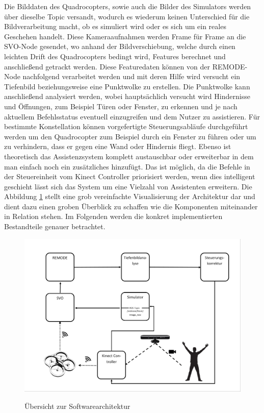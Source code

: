 Die Bilddaten des Quadrocopters, sowie auch die Bilder des Simulators werden über dieselbe Topic versandt, wodurch es wiederum keinen Unterschied für die Bildverarbeitung macht, ob es simuliert wird oder es sich um ein reales Geschehen handelt. Diese Kameraaufnahmen werden Frame für Frame an die SVO-Node gesendet, wo anhand der Bildverschiebung, welche durch einen leichten Drift des Quadrocopters bedingt wird, Features berechnet und anschließend getrackt werden. Diese Featuredaten können von der REMODE-Node nachfolgend verarbeitet werden und mit deren Hilfe wird versucht ein Tiefenbild beziehungsweise eine Punktwolke zu erstellen. Die Punktwolke kann anschließend analysiert werden, wobei hauptsächlich versucht wird Hindernisse und Öffnungen, zum Beispiel Türen oder Fenster, zu erkennen und je nach aktuellem Befehlsstatus eventuell einzugreifen und dem Nutzer zu assistieren. Für bestimmte Konstellation können vorgefertigte Steuerungsabläufe durchgeführt werden um den Quadrocopter zum Beispiel durch ein Fenster zu führen oder um zu verhindern, dass er gegen eine Wand oder Hindernis fliegt. \newline
Ebenso ist theoretisch das Assistenzsystem komplett austauschbar oder erweiterbar in dem man einfach noch ein zusätzliches hinzufügt. Das ist möglich, da die Befehle in der Steuereinheit vom Kinect Controller priorisiert werden, wenn dies intelligent geschieht lässt sich das System um eine Vielzahl von Assistenten erweitern. Die Abbildung \ref{fig:architecture} stellt eine grob vereinfachte Visualisierung der Architektur dar und dient dazu einen groben Überblick zu schaffen wie die Komponenten miteinander in Relation stehen. Im Folgenden werden die konkret implementierten Bestandteile genauer betrachtet.

\begin{figure}[ht]
	\centering
	\includegraphics[scale=0.5, trim=4 4 4 4,clip]{Bilder/page01.jpg}
	\label{fig:architecture}
	\caption{Übersicht zur Softwarearchitektur}
\end{figure}
\newpage
